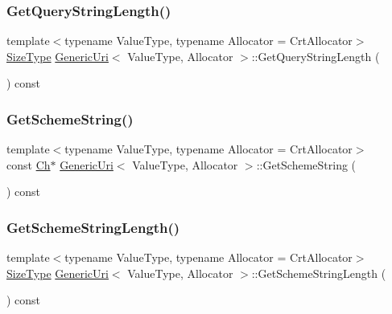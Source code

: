 \mbox{\label{classGenericUri_a6ef50d8c3d2d57ce653d88f0fb6297ce}} 
\subsubsection{\texorpdfstring{Get\+Query\+String\+Length()}{GetQueryStringLength()}}
{\footnotesize\ttfamily template$<$typename Value\+Type, typename Allocator = Crt\+Allocator$>$ \\
\hyperlink{rapidjson_8h_a5ed6e6e67250fadbd041127e6386dcb5}{Size\+Type} \hyperlink{classGenericUri}{Generic\+Uri}$<$ Value\+Type, Allocator $>$\+::Get\+Query\+String\+Length (\begin{DoxyParamCaption}{ }\end{DoxyParamCaption}) const\hspace{0.3cm}{\ttfamily [inline]}}

\mbox{\label{classGenericUri_ab692ff35e7bf2363adcc16f03c3ebc62}} 
\subsubsection{\texorpdfstring{Get\+Scheme\+String()}{GetSchemeString()}}
{\footnotesize\ttfamily template$<$typename Value\+Type, typename Allocator = Crt\+Allocator$>$ \\
const \hyperlink{classGenericUri_a20d0602cff62211d89bc4b25963beeee}{Ch}$\ast$ \hyperlink{classGenericUri}{Generic\+Uri}$<$ Value\+Type, Allocator $>$\+::Get\+Scheme\+String (\begin{DoxyParamCaption}{ }\end{DoxyParamCaption}) const\hspace{0.3cm}{\ttfamily [inline]}}

\mbox{\label{classGenericUri_ac3337c9af8f61c56301e2c51b9c03183}} 
\subsubsection{\texorpdfstring{Get\+Scheme\+String\+Length()}{GetSchemeStringLength()}}
{\footnotesize\ttfamily template$<$typename Value\+Type, typename Allocator = Crt\+Allocator$>$ \\
\hyperlink{rapidjson_8h_a5ed6e6e67250fadbd041127e6386dcb5}{Size\+Type} \hyperlink{classGenericUri}{Generic\+Uri}$<$ Value\+Type, Allocator $>$\+::Get\+Scheme\+String\+Length (\begin{DoxyParamCaption}{ }\end{DoxyParamCaption}) const\hspace{0.3cm}{\ttfamily [inline]}}

